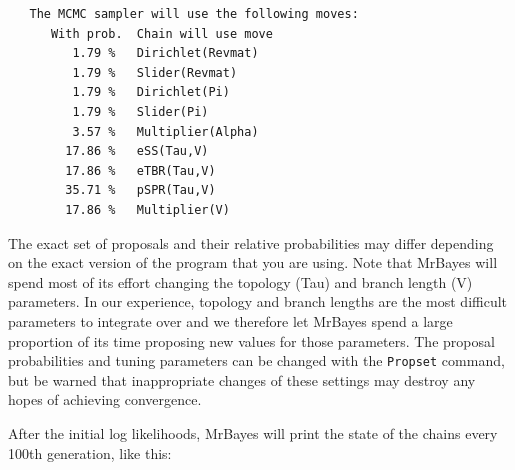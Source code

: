 \documentclass[12pt]{book}
\begin{document}
\begin{singlespacing}
\small
\begin{verbatim}
   The MCMC sampler will use the following moves:
      With prob.  Chain will use move
         1.79 %   Dirichlet(Revmat)
         1.79 %   Slider(Revmat)
         1.79 %   Dirichlet(Pi)
         1.79 %   Slider(Pi)
         3.57 %   Multiplier(Alpha)
        17.86 %   eSS(Tau,V)
        17.86 %   eTBR(Tau,V)
        35.71 %   pSPR(Tau,V)
        17.86 %   Multiplier(V)
\end{verbatim}
\normalsize
\end{singlespacing}

The exact set of proposals and their relative probabilities may differ depending on the exact version of the 
program that you are using. Note that MrBayes will spend most of its effort changing the topology (Tau) and 
branch length (V) parameters. In our experience, topology and branch lengths are the most difficult 
parameters to integrate over and we therefore let MrBayes spend a large proportion of its time proposing new 
values for those parameters. The proposal probabilities and tuning parameters can be changed with the 
\texttt{Propset} command, but be warned that inappropriate changes of these settings may destroy any hopes 
of achieving convergence.

After the initial log likelihoods, MrBayes will print the state of the chains every 100th generation, like 
this:
\end{document}
